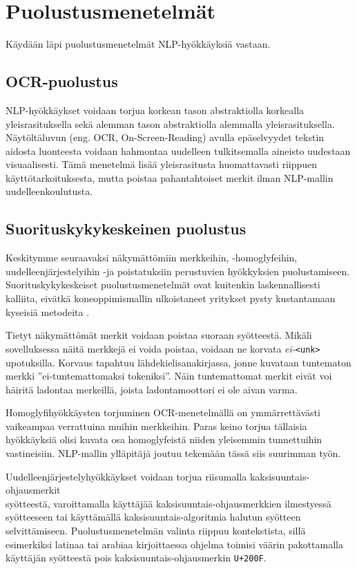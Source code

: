 \chapter{Puolustusmenetelmät\label{results}}
Käydään läpi puolustusmenetelmät NLP-hyökkäyksiä vastaan.

\section{OCR-puolustus}
NLP-hyökkäykset voidaan torjua korkean tason abstraktiolla korkealla yleisrasituksella sekä alemman tason abstraktiolla alemmalla yleisrasituksella. Näytöltäluvun (eng. OCR, On-Screen-Reading) avulla epäselvyydet tekstin aidosta luonteesta voidaan hahmontaa uudelleen tulkitsemalla aineisto uudestaan visuaalisesti. Tämä menetelmä lisää yleisrasitusta huomattavasti riippuen käyttötarkoituksesta, mutta poistaa pahantahtoiset merkit ilman NLP-mallin uudelleenkoulutusta. \citep{boucher2021bad}

\section{Suorituskykykeskeinen puolustus}
Keskitymme seuraavaksi näkymättömiin merkkeihin, -homoglyfeihin, \-uudelleenjärjestelyihin -ja poistatuksiin perustuvien hyökkyksien puolustamiseen. Suorituskykykeskeiset puolustusmenetelmät ovat kuitenkin laskennallisesti kalliita, eivätkä koneoppimismallin ulkoistaneet yritykset pysty kustantamaan kyseisiä metodeita \citep{https://doi.org/10.48550/arxiv.1911.07399}.

Tietyt näkymättömät merkit voidaan poistaa suoraan syötteestä. Mikäli sovelluksessa näitä merkkejä ei voida poistaa, voidaan ne korvata \textit{ei-}\texttt{<unk>} upotuksilla. Korvaus tapahtuu lähdekielisanakirjassa, jonne kuvataan tuntematon merkki ''ei-tuntemattomaksi tokeniksi''. Näin tuntemattomat merkit eivät voi häiritä ladontaa merkeillä, joista ladontamoottori ei ole aivan varma. \citep{boucher2021bad}

Homoglyfihyökkäysten torjuminen OCR-menetelmällä on ymmärrettävästi vaikeampaa verrattuina muihin merkkeihin. Paras keino torjua tällaisia hyökkäyksiä olisi kuvata osa homoglyfeistä niiden yleisemmin tunnettuihin vastineisiin. NLP-mallin ylläpitäjä joutuu tekemään tässä siis suurimman työn. \citep{boucher2021bad}

Uudelleenjärjestelyhyökkäykset voidaan torjua riisumalla kaksisuuntais-ohjausmerkit\\syötteestä, varoittamalla käyttäjää kaksisuuntais-ohjausmerkkien ilmestyessä syötteeseen tai käyttämällä kaksisuuntais-algoritmia halutun syötteen selvittämiseen. Puolustusmenetelmän valinta riippuu kontekstista, sillä esimerkiksi latinaa tai arabiaa kirjoittaessa ohjelma toimisi väärin pakottamalla käyttäjän syötteestä pois kaksisuuntais-ohjausmerkin \texttt{U+200F}. \citep{boucher2021bad}


